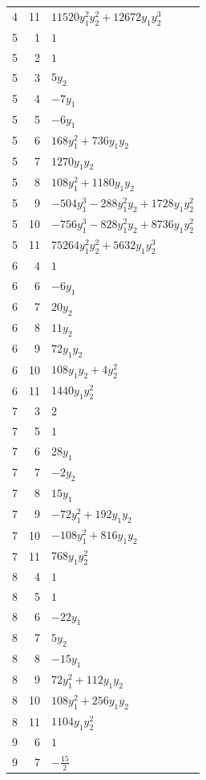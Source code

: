 \documentclass[10pt,a4paper]{article}
\begin{document}
{\begin{longtable}{rrp{125mm}}
4 & 11 & $11520 y_{1}^{2} y_{2}^{2} + 12672 y_{1} y_{2}^{3}$\\
5 & 1 & $1$\\
5 & 2 & $1$\\
5 & 3 & $5 y_{2}$\\
5 & 4 & $- 7 y_{1}$\\
5 & 5 & $- 6 y_{1}$\\
5 & 6 & $168 y_{1}^{2} + 736 y_{1} y_{2}$\\
5 & 7 & $1270 y_{1} y_{2}$\\
5 & 8 & $108 y_{1}^{2} + 1180 y_{1} y_{2}$\\
5 & 9 & $- 504 y_{1}^{3} - 288 y_{1}^{2} y_{2} + 1728 y_{1} y_{2}^{2}$\\
5 & 10 & $- 756 y_{1}^{3} - 828 y_{1}^{2} y_{2} + 8736 y_{1} y_{2}^{2}$\\
5 & 11 & $75264 y_{1}^{2} y_{2}^{2} + 5632 y_{1} y_{2}^{3}$\\
6 & 4 & $1$\\
6 & 6 & $- 6 y_{1}$\\
6 & 7 & $20 y_{2}$\\
6 & 8 & $11 y_{2}$\\
6 & 9 & $72 y_{1} y_{2}$\\
6 & 10 & $108 y_{1} y_{2} + 4 y_{2}^{2}$\\
6 & 11 & $1440 y_{1} y_{2}^{2}$\\
7 & 3 & $2$\\
7 & 5 & $1$\\
7 & 6 & $28 y_{1}$\\
7 & 7 & $- 2 y_{2}$\\
7 & 8 & $15 y_{1}$\\
7 & 9 & $- 72 y_{1}^{2} + 192 y_{1} y_{2}$\\
7 & 10 & $- 108 y_{1}^{2} + 816 y_{1} y_{2}$\\
7 & 11 & $768 y_{1} y_{2}^{2}$\\
8 & 4 & $1$\\
8 & 5 & $1$\\
8 & 6 & $- 22 y_{1}$\\
8 & 7 & $5 y_{2}$\\
8 & 8 & $- 15 y_{1}$\\
8 & 9 & $72 y_{1}^{2} + 112 y_{1} y_{2}$\\
8 & 10 & $108 y_{1}^{2} + 256 y_{1} y_{2}$\\
8 & 11 & $1104 y_{1} y_{2}^{2}$\\
9 & 6 & $1$\\
9 & 7 & $- \frac{15}{2}$\\

\end{longtable}}
\end{document}
